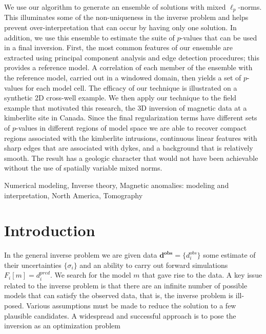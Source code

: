 \documentclass[extra,referee]{gji}
\begin{document}
\begin{summary}
We use our algorithm to generate an ensemble of solutions with mixed $\ell_p$-norms. This illuminates some of the non-uniqueness in the inverse problem and helps prevent over-interpretation that can occur by having only one solution. In addition, we use this ensemble to estimate the suite of ${p}$-values that can be used in a final inversion. First, the most common features of our ensemble are extracted using principal component analysis and edge detection procedures; this provides a reference model. A correlation of each member of the ensemble with the reference model, carried out in a windowed domain, then yields a set of ${p}$-values for each model cell. The efficacy of our technique is illustrated on a synthetic 2D cross-well example. We then apply our technique to the field example that motivated this research, the 3D inversion of magnetic data at a kimberlite site in Canada. Since the final regularization terms have different sets of $p$-values in different regions of model space we are able to recover compact regions associated with the kimberlite intrusions, continuous linear features with sharp edges that are associated with dykes, and a background that is relatively smooth. The result has a geologic character that would not have been achievable without the use of spatially variable mixed norms.



\end{summary}

\begin{keywords}
Numerical modeling, Inverse theory, Magnetic anomalies: modeling and interpretation, North America, Tomography
\end{keywords}

\section{Introduction}
In the general inverse problem we are given data $\mathbf{d^{obs}} = \{d_i^{obs}\}$ some estimate of their uncertainties $\{\sigma_i\}$ and an ability to carry out forward simulations $F_i[m]=d_i^{pred}$. We search for the model $m$ that gave rise to the data. A key issue related to the inverse problem is that there are an infinite number of possible models that can satisfy the observed data, that is, the inverse problem is ill-posed. Various assumptions must be made to reduce the solution to a few plausible candidates. A widespread and successful approach is to pose the inversion as an optimization problem
\end{document}
